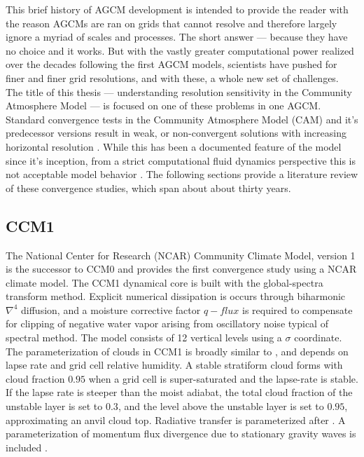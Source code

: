 This brief history of AGCM development is intended to provide the reader with the reason AGCMs are ran on grids that cannot resolve and therefore largely ignore a myriad of scales and processes. The short answer --- because they have no choice and it works. But with the vastly greater computational power realized over the decades following the first AGCM models, scientists have pushed for finer and finer grid resolutions, and with these, a whole new set of challenges. The title of this thesis --- understanding resolution sensitivity in the Community Atmosphere Model --- is focused on one of these problems in one AGCM. Standard convergence tests in the Community Atmosphere Model (CAM) and it's predecessor versions result in weak, or non-convergent solutions with increasing horizontal resolution \citep{KW1991JGR,WETAL1995CD,W1999T,W2008TELLUS,LETAL2011TELLUS,RJ2011MWR,RETAL2012ASL,OETAL2013JCLIM,RETAL2013JCLIM,ZetAl2014JCb,LETAL2015JCLIM}. While this has been a documented feature of the model since it's inception, from a strict computational fluid dynamics perspective this is not acceptable model behavior \citep{W2008TELLUS}. The following sections provide a literature review of these convergence studies, which span about about thirty years.

\subsection{CCM1}

The National Center for Research (NCAR) Community Climate Model, version 1 \citep{CCM1} is the successor to CCM0 and \cite{KW1991JGR} provides the first convergence study using a NCAR climate model. The CCM1 dynamical core is built with the global-spectra transform method. Explicit numerical dissipation is occurs through biharmonic $\nabla^{4}$ diffusion, and a moisture corrective factor $q-flux$ is required to compensate for clipping of negative water vapor arising from oscillatory noise typical of spectral method. The model consists of 12 vertical levels using a $\sigma$ coordinate. The parameterization of clouds in CCM1 is broadly similar to \citep{METAL1965MWR}, and depends on lapse rate and grid cell relative humidity. A stable stratiform cloud forms with cloud fraction $0.95$  when a grid cell is super-saturated and the lapse-rate is stable. If the lapse rate is steeper than the moist adiabat, the total cloud fraction of the unstable layer is set to $0.3$, and the level above the unstable layer is set to $0.95$, approximating an anvil cloud top. Radiative transfer is parameterized after \cite{CCM1RAD}. A parameterization of momentum flux divergence due to stationary gravity waves is included \citep{M1987JAS}. 


